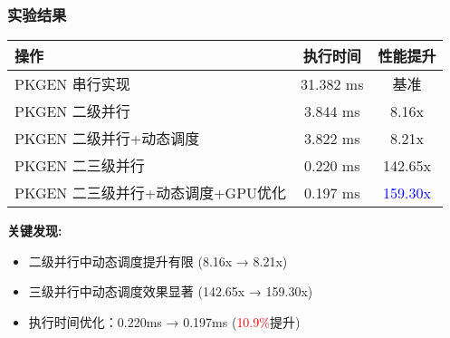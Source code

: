 \documentclass[slide]{../../custom}
\begin{document}
\begin{frame}
  \frametitle{实验结果}
  \centering
  \begin{tabular}{|l|c|c|}
    \hline
    \textbf{操作} & \textbf{执行时间} & \textbf{性能提升} \\
    \hline
    PKGEN 串行实现 \cite{Wang2025} & 31.382 ms & 基准 \\
    \hline
    PKGEN 二级并行 \cite{Wang2025} & 3.844 ms & 8.16x \\
    \hline
    PKGEN 二级并行+动态调度 & 3.822 ms & 8.21x \\
    \hline
    PKGEN 二三级并行 \cite{Wang2025} & 0.220 ms & 142.65x \\
    \hline
    PKGEN 二三级并行+动态调度+GPU优化 & 0.197 ms & \textcolor{blue}{159.30x} \\
    \hline
  \end{tabular}

  \vspace{0.5cm}
  \textbf{关键发现:}
  \begin{itemize}
    \item 二级并行中动态调度提升有限 (8.16x → 8.21x)
    \item 三级并行中动态调度效果显著 (142.65x → 159.30x)
    \item 执行时间优化：0.220ms → 0.197ms (\textcolor{red}{10.9\%}提升)
  \end{itemize}
\end{frame}
\end{document}
